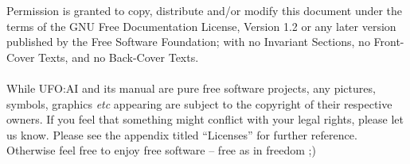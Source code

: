 


\thispagestyle{empty} %
Permission is granted to copy, distribute and/or modify this document under the terms of the GNU Free Documentation License, Version 1.2 or any later version published by the Free Software Foundation; with no Invariant Sections, no Front-Cover Texts, and no Back-Cover Texts.\\
\\
While UFO:AI and its manual are pure free software projects, any pictures, symbols, graphics \emph{etc} appearing are subject to the copyright of their respective owners. If you feel that something might conflict with your legal rights, please let us know. Please see the appendix titled ``Licenses'' for further reference. Otherwise feel free to enjoy free software -- free as in freedom ;) 

\maketitle
\thispagestyle{empty} %
\newpage
\tableofcontents











\appendix





